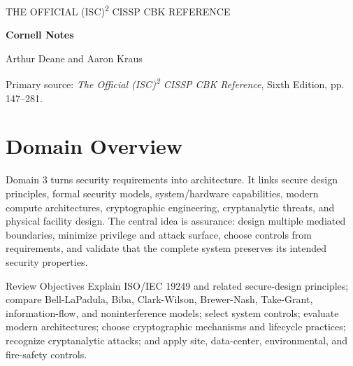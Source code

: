 \documentclass[10pt,letterpaper]{article}
\begin{document}
\hypersetup{pageanchor=false}
\begin{titlepage}\pagecolor{navy}\color{white}\vspace*{1.0in}
{\Large THE OFFICIAL (ISC)\textsuperscript{2} CISSP CBK REFERENCE\par}\vspace{0.25in}{\large Sixth Edition \textbullet\ 2021\par}\vfill
{\Huge\bfseries Cornell Notes\par}\vspace{0.25in}{\LARGE Domain 3\par}\vspace{0.08in}{\LARGE\bfseries Security Architecture and Engineering\par}\vfill
{\large Arthur Deane and Aaron Kraus\par}\vspace{0.12in}{\normalsize Study and review companion\par}\vspace{0.35in}
{\small Primary source: \textit{The Official (ISC)\textsuperscript{2} CISSP CBK Reference}, Sixth Edition, pp. 147--281.\par}
\end{titlepage}\hypersetup{pageanchor=true}\nopagecolor\color{black}

\section*{\color{navy}Domain Overview}
Domain 3 turns security requirements into architecture. It links secure design principles, formal security models, system/hardware capabilities, modern compute architectures, cryptographic engineering, cryptanalytic threats, and physical facility design. The central idea is assurance: design multiple mediated boundaries, minimize privilege and attack surface, choose controls from requirements, and validate that the complete system preserves its intended security properties.

\begin{summarybox}{Review Objectives}
Explain ISO/IEC 19249 and related secure-design principles; compare Bell-LaPadula, Biba, Clark-Wilson, Brewer-Nash, Take-Grant, information-flow, and noninterference models; select system controls; evaluate modern architectures; choose cryptographic mechanisms and lifecycle practices; recognize cryptanalytic attacks; and apply site, data-center, environmental, and fire-safety controls.
\end{summarybox}
\end{document}
